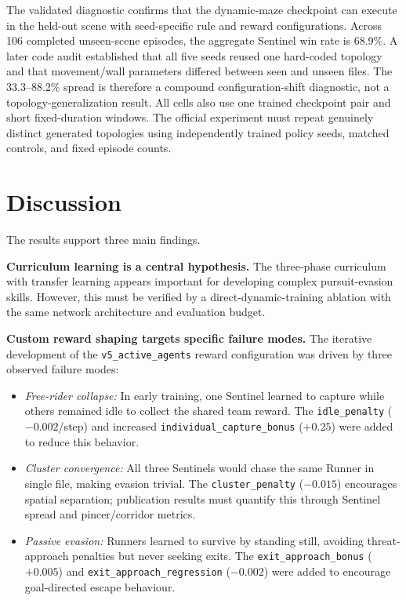 \documentclass[conference]{IEEEtran}
\begin{document}
The validated diagnostic confirms that the dynamic-maze checkpoint can execute in the held-out scene with seed-specific rule and reward configurations. Across 106 completed unseen-scene episodes, the aggregate Sentinel win rate is 68.9\%. A later code audit established that all five seeds reused one hard-coded topology and that movement/wall parameters differed between seen and unseen files. The 33.3--88.2\% spread is therefore a compound configuration-shift diagnostic, not a topology-generalization result. All cells also use one trained checkpoint pair and short fixed-duration windows. The official experiment must repeat genuinely distinct generated topologies using independently trained policy seeds, matched controls, and fixed episode counts.

\section{Discussion}

The results support three main findings.

\textbf{Curriculum learning is a central hypothesis.} The three-phase curriculum with transfer learning appears important for developing complex pursuit-evasion skills. However, this must be verified by a direct-dynamic-training ablation with the same network architecture and evaluation budget.

\textbf{Custom reward shaping targets specific failure modes.} The iterative development of the \texttt{v5\_active\_agents} reward configuration was driven by three observed failure modes:
\begin{itemize}
    \item \textit{Free-rider collapse:} In early training, one Sentinel learned to capture while others remained idle to collect the shared team reward. The \texttt{idle\_penalty} ($-0.002$/step) and increased \texttt{individual\_capture\_bonus} ($+0.25$) were added to reduce this behavior.
    \item \textit{Cluster convergence:} All three Sentinels would chase the same Runner in single file, making evasion trivial. The \texttt{cluster\_penalty} ($-0.015$) encourages spatial separation; publication results must quantify this through Sentinel spread and pincer/corridor metrics.
    \item \textit{Passive evasion:} Runners learned to survive by standing still, avoiding threat-approach penalties but never seeking exits. The \texttt{exit\_approach\_bonus} ($+0.005$) and \texttt{exit\_approach\_regression} ($-0.002$) were added to encourage goal-directed escape behaviour.
\end{itemize}
\end{document}
